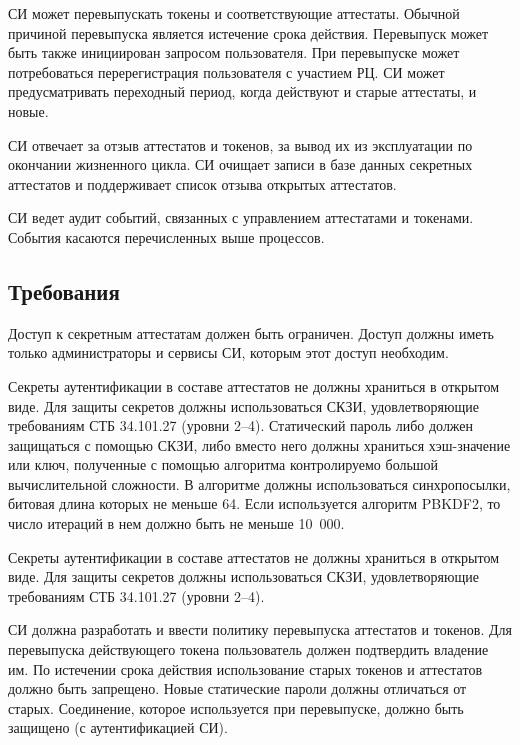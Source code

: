 %

СИ может перевыпускать токены и соответствующие аттестаты. Обычной причиной
перевыпуска является истечение срока действия. Перевыпуск может быть также
инициирован запросом пользователя. При перевыпуске может потребоваться
перерегистрация пользователя с участием РЦ. СИ может предусматривать переходный
период, когда действуют и старые аттестаты, и новые.

СИ отвечает за отзыв аттестатов и токенов, за вывод их из эксплуатации по 
окончании жизненного цикла. 
%
СИ очищает записи в базе данных секретных аттестатов и поддерживает список 
отзыва открытых аттестатов.

СИ ведет аудит событий, связанных с управлением аттестатами и токенами. 
События касаются перечисленных выше процессов.

\subsection{Требования}\label{CM.Reqs}

Доступ к секретным аттестатам должен быть ограничен.
Доступ должны иметь только администраторы и сервисы СИ,
которым этот доступ необходим. 

Секреты аутентификации в составе аттестатов не должны храниться в открытом 
виде. 
%
Для защиты секретов должны использоваться СКЗИ, удовлетворяющие 
требованиям СТБ 34.101.27 (уровни 2--4).
%
Статический пароль либо должен защищаться с помощью СКЗИ, 
либо вместо него должны храниться хэш-значение или ключ, 
полученные с помощью алгоритма контролируемо большой вычислительной 
сложности. В алгоритме должны использоваться синхропосылки, 
битовая длина которых не меньше 64. Если используется алгоритм PBKDF2,
то число итераций в нем должно быть не меньше 10~000.

Секреты аутентификации в составе аттестатов не должны храниться в открытом 
виде. Для защиты секретов должны использоваться СКЗИ, удовлетворяющие 
требованиям СТБ 34.101.27 (уровни 2--4).


СИ должна разработать и ввести политику перевыпуска аттестатов и токенов.
Для перевыпуска действующего токена пользователь должен 
подтвердить владение им. По истечении срока действия
использование старых токенов и аттестатов должно быть запрещено. 
Новые статические пароли должны отличаться от старых. 
Соединение, которое используется при перевыпуске, должно быть защищено 
(с аутентификацией СИ). 

